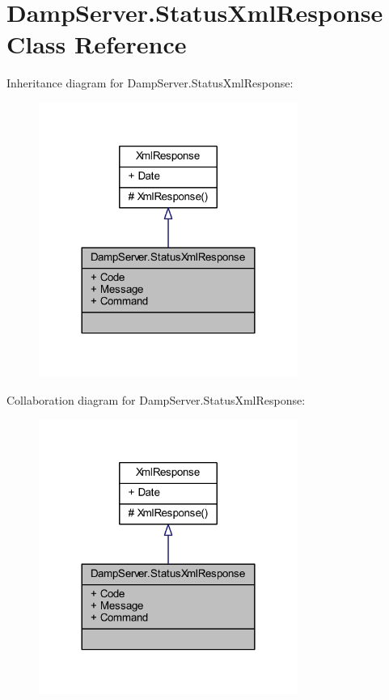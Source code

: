 \hypertarget{class_damp_server_1_1_status_xml_response}{\section{Damp\-Server.\-Status\-Xml\-Response Class Reference}
\label{class_damp_server_1_1_status_xml_response}
}


Inheritance diagram for Damp\-Server.\-Status\-Xml\-Response\-:\nopagebreak
\begin{figure}[H]
\begin{center}
\leavevmode
\includegraphics[width=240pt]{class_damp_server_1_1_status_xml_response__inherit__graph}
\end{center}
\end{figure}


Collaboration diagram for Damp\-Server.\-Status\-Xml\-Response\-:\nopagebreak
\begin{figure}[H]
\begin{center}
\leavevmode
\includegraphics[width=240pt]{class_damp_server_1_1_status_xml_response__coll__graph}
\end{center}
\end{figure}
